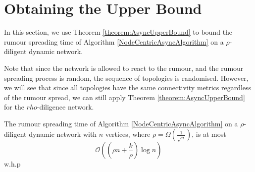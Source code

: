 \section{Obtaining the Upper Bound}

In this section, we use Theorem \ref{theorem:AsyncUpperBound} to bound the rumour spreading time of Algorithm \ref{NodeCentricAsyncAlgorithm} on a $\rho$-diligent dynamic network. 

Note that since the network is allowed to react to the rumour, and the rumour spreading process is random, the sequence of topologies is randomised. However, we will see that since all topologies have the same connectivity metrics regardless of the rumour spread, we can still apply Theorem \ref{theorem:AsyncUpperBound} for the $rho$-diligence network.

\begin{theorem}
	The rumour spreading time of Algorithm \ref{NodeCentricAsyncAlgorithm} on a $\rho$-diligent dynamic network with $n$ vertices, where $\rho = \Omega(\frac{1}{\sqrt{n}})$, is at most 
	$$
		\mathcal{O}\left(\left(\rho n + \frac{k}{\rho}\right)\log n\right)
	$$
	w.h.p
\end{theorem}

